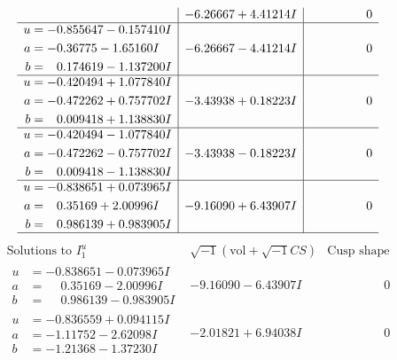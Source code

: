 \documentclass[1p]{elsarticle_modified}
\theoremstyle{definition}
\newcommand{\I}{\sqrt{-1}}
\begin{document}
$$\begin{array}{c|c|c}
 & -6.26667 + 4.41214 I & \phantom{-0.000000 } 0 \\ \hline\begin{aligned}
u &= -0.855647 - 0.157410 I \\
a &= -0.36775 - 1.65160 I \\
b &= \phantom{-}0.174619 - 1.137200 I\end{aligned}
 & -6.26667 - 4.41214 I & \phantom{-0.000000 } 0 \\ \hline\begin{aligned}
u &= -0.420494 + 1.077840 I \\
a &= -0.472262 + 0.757702 I \\
b &= \phantom{-}0.009418 + 1.138830 I\end{aligned}
 & -3.43938 + 0.18223 I & \phantom{-0.000000 } 0 \\ \hline\begin{aligned}
u &= -0.420494 - 1.077840 I \\
a &= -0.472262 - 0.757702 I \\
b &= \phantom{-}0.009418 - 1.138830 I\end{aligned}
 & -3.43938 - 0.18223 I & \phantom{-0.000000 } 0 \\ \hline\begin{aligned}
u &= -0.838651 + 0.073965 I \\
a &= \phantom{-}0.35169 + 2.00996 I \\
b &= \phantom{-}0.986139 + 0.983905 I\end{aligned}
 & -9.16090 + 6.43907 I & \phantom{-0.000000 } 0\\
 \hline 
 \end{array}$$\newpage$$\begin{array}{c|c|c}  
\text{Solutions to }I^u_{1}& \I (\text{vol} + \sqrt{-1}CS) & \text{Cusp shape}\\
 \hline 
\begin{aligned}
u &= -0.838651 - 0.073965 I \\
a &= \phantom{-}0.35169 - 2.00996 I \\
b &= \phantom{-}0.986139 - 0.983905 I\end{aligned}
 & -9.16090 - 6.43907 I & \phantom{-0.000000 } 0 \\ \hline\begin{aligned}
u &= -0.836559 + 0.094115 I \\
a &= -1.11752 - 2.62098 I \\
b &= -1.21368 - 1.37230 I\end{aligned}
 & -2.01821 + 6.94038 I & \phantom{-0.000000 } 0 \\ \hline\begin{aligned}

\end{aligned}
\end{array}$$
\end{document}
